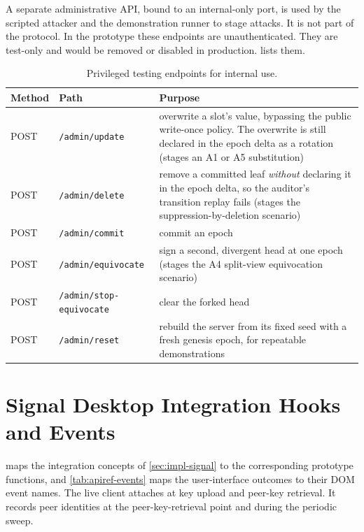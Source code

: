 A separate administrative API, bound to an internal-only port, is used by the scripted attacker and
the demonstration runner to stage attacks. It is not part of the protocol. In the
prototype these endpoints are unauthenticated. They are test-only and would be removed or
disabled in production.  lists them.

\begin{table}[ht]
\centering
\caption{Privileged testing endpoints for internal use.}
\label{tab:apiref-admin}
\setlength{\extrarowheight}{2pt}
\small
\begin{tabularx}{\textwidth}{@{}>{\raggedright\arraybackslash}p{1.5cm}>{\raggedright\arraybackslash}p{4.2cm}>{\raggedright\arraybackslash}X@{}}
\toprule
Method & Path & Purpose \\
\midrule
POST & \texttt{/admin/update} & overwrite a slot's value, bypassing the public write-once policy. The overwrite is still declared in the epoch delta as a rotation (stages an A1 or A5 substitution) \\
POST & \texttt{/admin/delete} & remove a committed leaf \emph{without} declaring it in the epoch delta, so the auditor's transition replay fails (stages the suppression-by-deletion scenario) \\
POST & \texttt{/admin/commit} & commit an epoch \\
POST & \texttt{/admin/equivocate} & sign a second, divergent head at one epoch (stages the A4 split-view equivocation scenario) \\
POST & \texttt{/admin/stop-equivocate} & clear the forked head \\
POST & \texttt{/admin/reset} & rebuild the server from its fixed seed with a fresh genesis epoch, for repeatable demonstrations \\
\bottomrule
\end{tabularx}
\end{table}

\FloatBarrier
\section{Signal Desktop Integration Hooks and Events}\label{sec:apiref-hooks}

 maps the integration concepts of \cref{sec:impl-signal} to the
corresponding prototype functions, and \cref{tab:apiref-events} maps the user-interface
outcomes to their DOM event names. The live client attaches at key upload and peer-key retrieval. It
records peer identities at the peer-key-retrieval point and during the periodic sweep.

